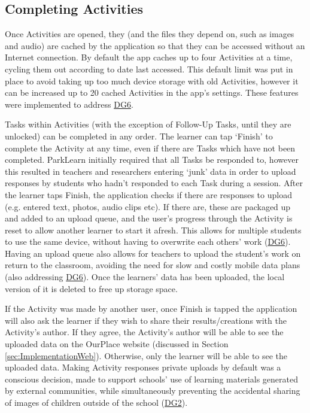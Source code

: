 \subsection{Completing Activities}

Once Activities are opened, they (and the files they depend on, such as images and audio) are cached by the application so that they can be accessed without an Internet connection. By default the app caches up to four Activities at a time, cycling them out according to date last accessed. This default limit was put in place to avoid taking up too much device storage with old Activities, however it can be increased up to 20 cached Activities in the app's settings. These features were implemented to address \hyperref[DG6]{DG6}.

Tasks within Activities (with the exception of Follow-Up Tasks, until they are unlocked) can be completed in any order. The learner can tap `Finish' to complete the Activity at any time, even if there are Tasks which have not been completed. ParkLearn initially required that all Tasks be responded to, however this resulted in teachers and researchers entering `junk' data in order to upload responses by students who hadn't responded to each Task during a session. After the learner taps Finish, the application checks if there are responses to upload (e.g. entered text, photos, audio clips etc). If there are, these are packaged up and added to an upload queue, and the user's progress through the Activity is reset to allow another learner to start it afresh. This allows for multiple students to use the same device, without having to overwrite each others' work (\hyperref[DG6]{DG6}). Having an upload queue also allows for teachers to upload the student's work on return to the classroom, avoiding the need for slow and costly mobile data plans (also addressing \hyperref[DG6]{DG6}). Once the learners' data has been uploaded, the local version of it is deleted to free up storage space.

If the Activity was made by another user, once Finish is tapped the application will also ask the learner if they wish to share their results/creations with the Activity's author. If they agree, the Activity's author will be able to see the uploaded data on the OurPlace website (discussed in Section \ref{sec:ImplementationWeb}). Otherwise, only the learner will be able to see the uploaded data. Making Activity responses private uploads by default was a conscious decision, made to support schools' use of learning materials generated by external communities, while simultaneously preventing the accidental sharing of images of children outside of the school (\hyperref[DG2]{DG2}). 

